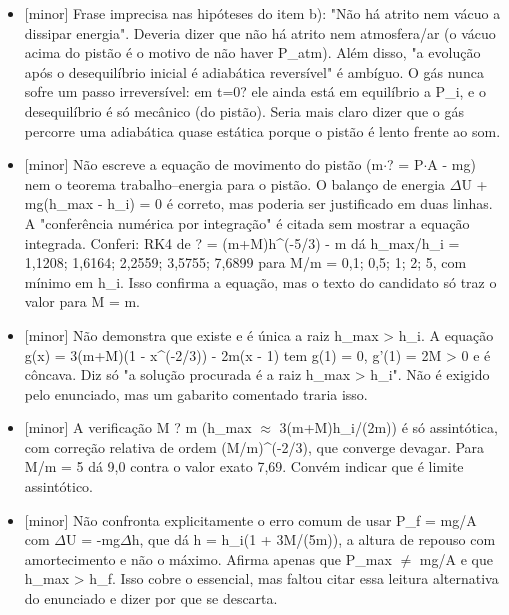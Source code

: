 \documentclass{article}%
\begin{document}
\begin{itemize}%
\item%
{[}minor{]} Frase imprecisa nas hipóteses do item b): "Não há atrito nem vácuo a dissipar energia". Deveria dizer que não há atrito nem atmosfera/ar (o vácuo acima do pistão é o motivo de não haver P\_atm). Além disso, "a evolução após o desequilíbrio inicial é adiabática reversível" é ambíguo. O gás nunca sofre um passo irreversível: em t=0? ele ainda está em equilíbrio a P\_i, e o desequilíbrio é só mecânico (do pistão). Seria mais claro dizer que o gás percorre uma adiabática quase estática porque o pistão é lento frente ao som.%
\item%
{[}minor{]} Não escreve a equação de movimento do pistão (m$\cdot$? = P$\cdot$A - mg) nem o teorema trabalho--energia para o pistão. O balanço de energia $\Delta$U + mg(h\_max - h\_i) = 0 é correto, mas poderia ser justificado em duas linhas. A "conferência numérica por integração" é citada sem mostrar a equação integrada. Conferi: RK4 de ? = (m+M)h\^{}(-5/3) - m dá h\_max/h\_i = 1,1208; 1,6164; 2,2559; 3,5755; 7,6899 para M/m = 0,1; 0,5; 1; 2; 5, com mínimo em h\_i. Isso confirma a equação, mas o texto do candidato só traz o valor para M = m.%
\item%
{[}minor{]} Não demonstra que existe e é única a raiz h\_max > h\_i. A equação g(x) = 3(m+M)(1 - x\^{}(-2/3)) - 2m(x - 1) tem g(1) = 0, g'(1) = 2M > 0 e é côncava. Diz só "a solução procurada é a raiz h\_max > h\_i". Não é exigido pelo enunciado, mas um gabarito comentado traria isso.%
\item%
{[}minor{]} A verificação M ? m (h\_max $\approx$ 3(m+M)h\_i/(2m)) é só assintótica, com correção relativa de ordem (M/m)\^{}(-2/3), que converge devagar. Para M/m = 5 dá 9,0 contra o valor exato 7,69. Convém indicar que é limite assintótico.%
\item%
{[}minor{]} Não confronta explicitamente o erro comum de usar P\_f = mg/A com $\Delta$U = -mg$\Delta$h, que dá h = h\_i(1 + 3M/(5m)), a altura de repouso com amortecimento e não o máximo. Afirma apenas que P\_max $\neq$ mg/A e que h\_max > h\_f. Isso cobre o essencial, mas faltou citar essa leitura alternativa do enunciado e dizer por que se descarta.%
\end{itemize}%
\end{document}
